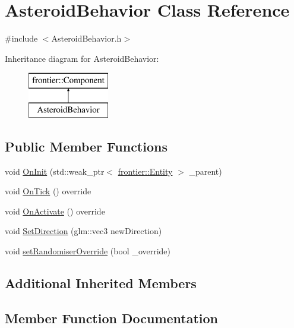 \hypertarget{class_asteroid_behavior}{}\section{Asteroid\+Behavior Class Reference}
\label{class_asteroid_behavior}


{\ttfamily \#include $<$Asteroid\+Behavior.\+h$>$}

Inheritance diagram for Asteroid\+Behavior\+:\begin{figure}[H]
\begin{center}
\leavevmode
\includegraphics[height=2.000000cm]{class_asteroid_behavior}
\end{center}
\end{figure}
\subsection*{Public Member Functions}
\begin{DoxyCompactItemize}
\item 
void \hyperlink{class_asteroid_behavior_a79d9559f0d8e109e928acf7f8ff7acea}{On\+Init} (std\+::weak\+\_\+ptr$<$ \hyperlink{classfrontier_1_1_entity}{frontier\+::\+Entity} $>$ \+\_\+parent)
\item 
void \hyperlink{class_asteroid_behavior_a3c1287599e132b49be851d9eeec6380e}{On\+Tick} () override
\item 
void \hyperlink{class_asteroid_behavior_a7c4f344a9461d1296d4dcfcd51ed3bbc}{On\+Activate} () override
\item 
void \hyperlink{class_asteroid_behavior_ab1f0bf83f6291bda3934c1b48141908f}{Set\+Direction} (glm\+::vec3 new\+Direction)
\item 
void \hyperlink{class_asteroid_behavior_a6059686f8a09c3911187407143d3a3cf}{set\+Randomiser\+Override} (bool \+\_\+override)
\end{DoxyCompactItemize}
\subsection*{Additional Inherited Members}


\subsection{Member Function Documentation}
\mbox{\label{class_asteroid_behavior_a7c4f344a9461d1296d4dcfcd51ed3bbc}} 
